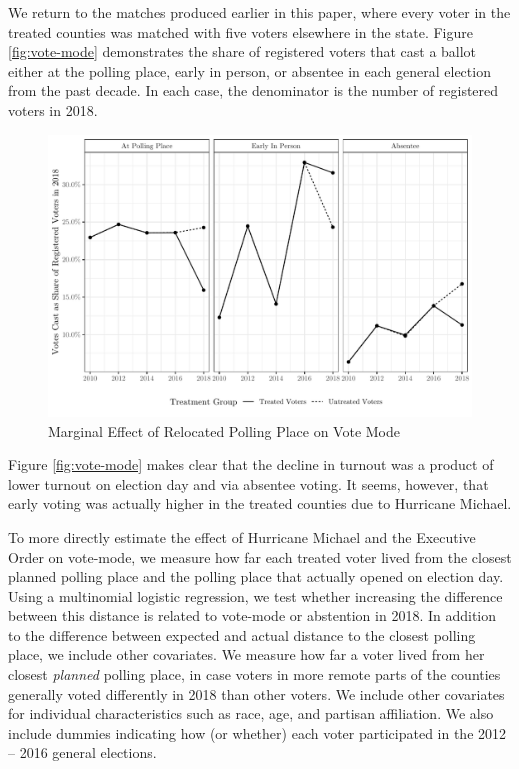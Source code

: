 \documentclass[
  12pt,
]{article}
\begin{document}
We return to the matches produced earlier in this paper, where every voter in the treated counties was matched with five voters elsewhere in the state. Figure \ref{fig:vote-mode} demonstrates the share of registered voters that cast a ballot either at the polling place, early in person, or absentee in each general election from the past decade. In each case, the denominator is the number of registered voters in 2018.

\begin{figure}[h]

{\centering \includegraphics{hurricane_michael_files/figure-latex/vote-mode-chunk-1} 

}

\caption{\label{fig:vote-mode}Marginal Effect of Relocated Polling Place on Vote Mode}\label{fig:vote-mode-chunk}
\end{figure}

Figure \ref{fig:vote-mode} makes clear that the decline in turnout was a product of lower turnout on election day and via absentee voting. It seems, however, that early voting was actually higher in the treated counties due to Hurricane Michael.

To more directly estimate the effect of Hurricane Michael and the Executive Order on vote-mode, we measure how far each treated voter lived from the closest planned polling place and the polling place that actually opened on election day. Using a multinomial logistic regression, we test whether increasing the difference between this distance is related to vote-mode or abstention in 2018. In addition to the difference between expected and actual distance to the closest polling place, we include other covariates. We measure how far a voter lived from her closest \emph{planned} polling place, in case voters in more remote parts of the counties generally voted differently in 2018 than other voters. We include other covariates for individual characteristics such as race, age, and partisan affiliation. We also include dummies indicating how (or whether) each voter participated in the 2012 -- 2016 general elections.
\end{document}
